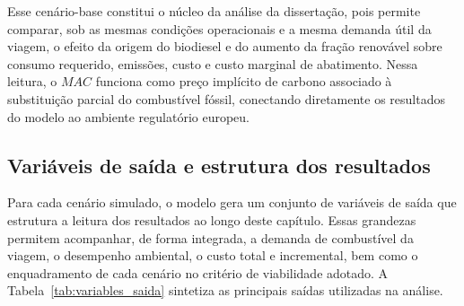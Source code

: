 Esse cenário-base constitui o núcleo da análise da dissertação, pois permite comparar, sob as mesmas condições operacionais e a mesma demanda útil da viagem, o efeito da origem do biodiesel e do aumento da fração renovável sobre consumo requerido, emissões, custo e custo marginal de abatimento. Nessa leitura, o $MAC$ funciona como preço implícito de carbono associado à substituição parcial do combustível fóssil, conectando diretamente os resultados do modelo ao ambiente regulatório europeu.

\subsection{Variáveis de saída e estrutura dos resultados}

Para cada cenário simulado, o modelo gera um conjunto de variáveis de saída que estrutura a leitura dos resultados ao longo deste capítulo. Essas grandezas permitem acompanhar, de forma integrada, a demanda de combustível da viagem, o desempenho ambiental, o custo total e incremental, bem como o enquadramento de cada cenário no critério de viabilidade adotado. A Tabela~\ref{tab:variables_saida} sintetiza as principais saídas utilizadas na análise.

